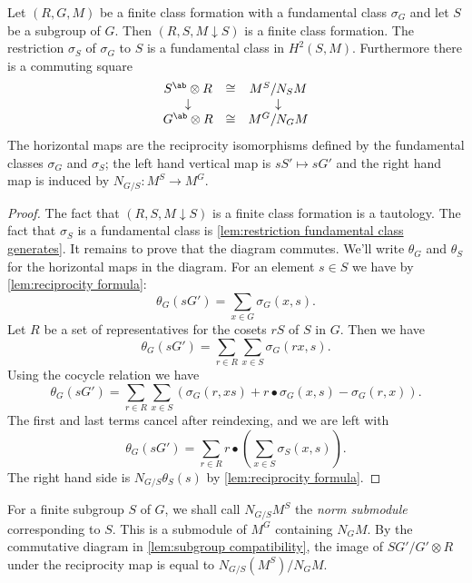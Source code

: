\begin{lemma} \label{lem:subgroup compatibility}
	Let $(R,G,M)$ be a finite class formation with a fundamental class $\sigma_G$
	and let $S$ be a subgroup of $G$.
	Then $(R, S, M \downarrow S)$ is a finite class formation. The restriction $\sigma_S$ of $\sigma_G$
	to $S$ is a fundamental class in $H^2(S,M)$.
	Furthermore there is a commuting square
	\[
		\begin{matrix}
			S^{\ab} \otimes R & \cong & M^S / N_SM \\
			\downarrow && \downarrow \\
			G^{\ab} \otimes R & \cong & M^G / N_GM
		\end{matrix}
	\]
	The horizontal maps are the reciprocity isomorphisms defined by the fundamental classes
	$\sigma_G$ and $\sigma_S$; the left hand vertical map is $sS' \mapsto sG'$ and the right hand map
	is induced by $N_{G/S} :M^S \to M^G$.
\end{lemma}


\begin{proof}
	The fact that $(R, S, M \downarrow S)$ is a finite class formation is a tautology.
	The fact that $\sigma_S$
	is a fundamental class is \ref{lem:restriction fundamental class generates}.
	It remains to prove that the diagram commutes.
	We'll write $\theta_G$ and $\theta_S$ for the horizontal maps in the diagram.
	For an element $s \in S$ we have by \ref{lem:reciprocity formula}:
	\[
		\theta_G(sG') = \sum_{x \in G} \sigma_G(x,s).
	\]
	Let $R$ be a set of representatives for the cosets $rS$ of $S$ in $G$.
	Then we have
	\[
		\theta_G(sG') = \sum_{r \in R} \sum_{x \in S} \sigma_G(rx,s).
	\]
	Using the cocycle relation we have
	\[
		\theta_G(sG') = \sum_{r \in R} \sum_{x \in S}
		\left(\sigma_G(r,xs) + r \bullet \sigma_G(x,s) - \sigma_G(r,x)\right).
	\]
	The first and last terms cancel after reindexing, and we are left with
	\[
		\theta_G(sG') = \sum_{r \in R} r \bullet \left(\sum_{x \in S}  \sigma_S(x,s)\right).
	\]
	The right hand side is $N_{G/S} \theta_S(s)$ by \ref{lem:reciprocity formula}.
\end{proof}


\begin{definition} \label{def:norm submodule}
	For a finite subgroup $S$ of $G$, we shall call $N_{G/S}M^S$ the \emph{norm submodule}
	corresponding to $S$. This is a submodule of $M^G$ containing $N_G M$.
	By the commutative diagram in \ref{lem:subgroup compatibility},
	the image of $SG'/G' \otimes R$ under the reciprocity map is equal to
	$N_{G/S}(M^S) / N_G M$.
\end{definition}


